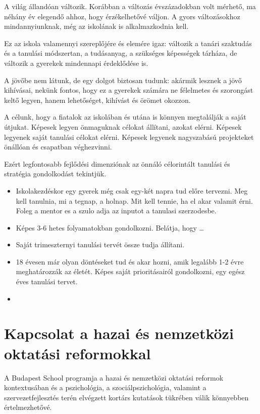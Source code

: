 A világ állandóan változik. Korábban a változás évszázadokban volt mérhető, ma
néhány év elegendő ahhoz, hogy érzékelhetővé váljon. A gyors változásokhoz
mindannyiunknak, még az iskolának is alkalmazkodnia kell.

Ez az iskola valamennyi szereplőjére és elemére igaz: változik a tanári
szaktudás és a tanulási módszertan, a tudásanyag, a szükséges képességek
tárháza, de változik a gyerekek mindennapi érdeklődése is.

A jövőbe nem látunk, de egy dolgot biztosan tudunk: akármik lesznek a jövő
kihívásai, nekünk fontos, hogy ez a gyerekek számára ne félelmetes és
szorongást keltő legyen, hanem lehetőséget, kihívást és örömet okozzon.

A célunk, hogy a fiatalok az iskolában és utána is könnyen megtalálják a saját
útjukat. Képesek legyen önmaguknak célokat állítani, azokat elérni. Képesek
legyenek saját tanulási célokat elérni. Képesek legyenek nagyszabású
projekteket önállóan és csapatban véghezvinni.

Ezért legfontosabb fejlődési dimenziónak az önnáló célorintált tanulási és
stratégia gondolkodást tekintjük.
\begin{itemize}
      \item Iskolakezdéskor egy gyerek még csak egy-két napra tud előre
            tervezni. Meg kell tanulnia, mi a tegnap, a holnap. Mit kell tennie, ha el akar
            valamit érni. Foleg a mentor es a szulo adja az inputot a tanulasi szerzodesbe.
      \item Képes 3-6 hetes folyamatokban gondolkozni. Belátja, hogy \dots
      \item Saját trimeszternyi tanulási tervét össze tudja állítani.
      \item 18 évesen már olyan döntéseket tud és akar hozni, amik legalább 1-2
            évre meghatározzák az életét. Képes saját prioritásairól gondolkozni, egy egész
            éves tanulási tervet.
      \item
\end{itemize}

\section{Kapcsolat a hazai és nemzetközi oktatási
  reformokkal}\label{sec:kapcsolat_reformokkal}

A Budapest School programja a hazai és nemzetközi oktatási reformok
kontextusában és a pszichológia, a szociálpszichológia, valamint a
szervezetfejlesztés terén elvégzett kortárs kutatások tükrében válik
könnyebben értelmezhetővé.

